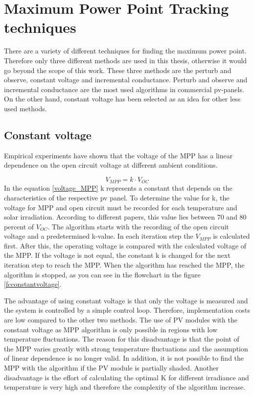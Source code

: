 \section{Maximum Power Point Tracking techniques\label{MPPTalgo}}

There are a variety of different techniques for finding the maximum power point. Therefore only three different methods are used in this thesis, otherwise it would go beyond the scope of this work. These three methods are the perturb and observe, constant voltage and incremental conductance. Perturb and observe and incremental conductance are the most used algorithms in commercial pv-panels. On the other hand, constant voltage has been selected as an idea for other less used methods.

\subsection{Constant voltage}
Empirical experiments have shown that the voltage of the MPP has a linear dependence on the open circuit voltage at different ambient conditions.

\begin{equation} \label{voltage_MPP}
V_{MPP} = k \cdot V_{OC}	
\end{equation} 
In the equation \ref{voltage_MPP} k represents a constant that depends on the characteristics of the respective pv panel. To determine the value for k, the voltage for MPP and open circuit must be recorded for each temperature and solar irradiation. According to different papers, this value lies between 70 and 80 percent of $V_{OC}$\cite{MPPTResearch}. The algorithm starts with the recording of the open circuit voltage and a predetermined k-value. In each iteration step the $V_{MPP}$ is calculated first. After this, the operating voltage is compared with the calculated voltage of the MPP. If the voltage is not equal, the constant k is changed for the next iteration step to reach the MPP. When the algorithm has reached the MPP, the algorithm is stopped, as you can see in the flowchart in the figure \ref{fcconstantvoltage}\cite{flowchartVC}. 

The advantage of using constant voltage is that only the voltage is measured and the system is controlled by a simple control loop. Therefore, implementation costs are low compared to the other two methods. The use of PV modules with the constant voltage as MPP algorithm is only possible in regions with low temperature fluctuations. The reason for this disadvantage is that the point of the MPP varies greatly with strong temperature fluctuations and the assumption of linear dependence is no longer valid. In addition, it is not possible to find the MPP with the algorithm if the PV module is partially shaded. Another disadvantage is the effort of calculating the optimal K for different irradiance and temperature is very high and therefore the complexity of the algorithm increase\cite{flowchartVC}.

